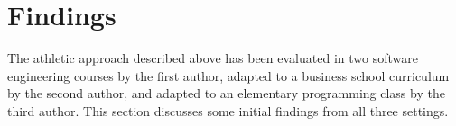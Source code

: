 \section{Findings}

The athletic approach described above has been evaluated in two software engineering courses by the first author, adapted to a business school curriculum by the second author, and adapted to an elementary programming class by the third author.  This section discusses some initial findings from all three settings.




